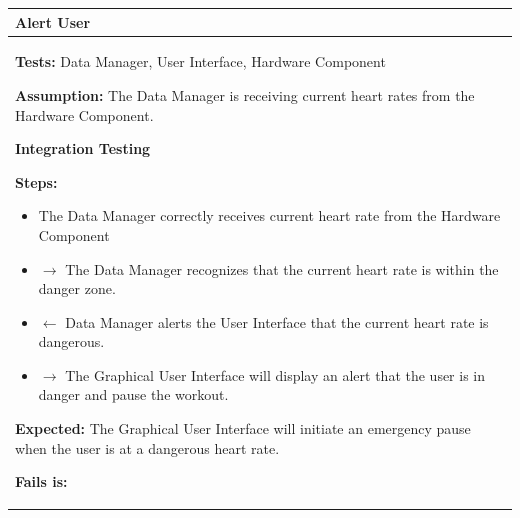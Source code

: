 \documentclass[letterpaper,english, 12pt]{scrreprt}
\begin{document}
\begin{center}
         \begin{tabular}{|C{15cm}|}
                 \hline
                        \textbf{Alert User} \\
                \hline
                        \begin{flushleft}
                                \textbf{Tests: } Data Manager, User Interface, Hardware Component
                        \end{flushleft}
                        \begin{flushleft}
                                \textbf{Assumption: } The Data Manager is receiving current heart rates from the Hardware Component.
                        \end{flushleft}
			\begin{center}
				\textbf{Integration Testing}
			\end{center}
                        \begin{flushleft}
                                \textbf{Steps: }
                        \end{flushleft}
                                \begin{itemize}
                                        \item The Data Manager correctly receives current heart rate from the Hardware Component
                                        \item $\rightarrow$ The Data Manager recognizes that the current heart rate is within the danger zone.
                                        \item $\leftarrow$ Data Manager alerts the User Interface that the current heart rate is dangerous.
                                        \item $\rightarrow$ The Graphical User Interface will display an alert that the user is in danger and pause the workout.
                                \end{itemize}
                        \begin{flushleft}
                                \textbf{Expected: } The Graphical User Interface will initiate an emergency pause when the user is at a dangerous heart rate.
                        \end{flushleft}
                        \begin{flushleft}
                                \textbf{Fails is: }
                        \end{flushleft}

\end{tabular}
\end{center}
\end{document}
